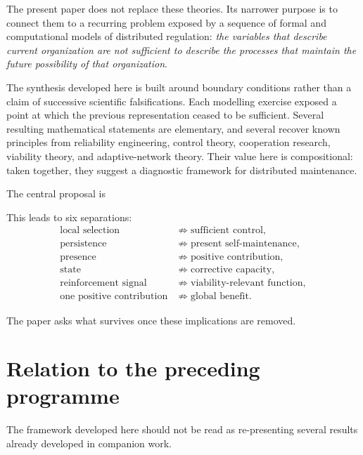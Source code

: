 The present paper does not replace these theories. Its narrower purpose is to connect them to a recurring problem exposed by a sequence of formal and computational models of distributed regulation: \emph{the variables that describe current organization are not sufficient to describe the processes that maintain the future possibility of that organization}.

The synthesis developed here is built around boundary conditions rather than a claim of successive scientific falsifications. Each modelling exercise exposed a point at which the previous representation ceased to be sufficient. Several resulting mathematical statements are elementary, and several recover known principles from reliability engineering, control theory, cooperation research, viability theory, and adaptive-network theory. Their value here is compositional: taken together, they suggest a diagnostic framework for distributed maintenance.

The central proposal is
\begin{center}
\end{center}

This leads to six separations:
\[
\begin{aligned}
\text{local selection} &\not\Rightarrow \text{sufficient control},\\
\text{persistence} &\not\Rightarrow \text{present self-maintenance},\\
\text{presence} &\not\Rightarrow \text{positive contribution},\\
\text{state} &\not\Rightarrow \text{corrective capacity},\\
\text{reinforcement signal} &\not\Rightarrow \text{viability-relevant function},\\
\text{one positive contribution} &\not\Rightarrow \text{global benefit}.
\end{aligned}
\]

The paper asks what survives once these implications are removed.

\section{Relation to the preceding programme}

The framework developed here should not be read as re-presenting several results already developed in companion work.

